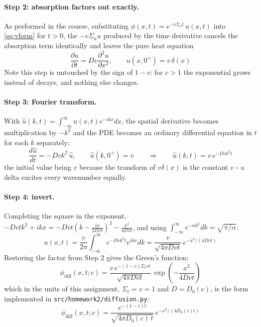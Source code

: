 \documentclass[11pt]{article}
\begin{document}
\paragraph{Step 2: absorption factors out exactly.} As performed in the course, substituting
$\phi(x,t) = e^{-v\Sigma_a t}\,u(x,t)$ into \eqref{eq:vform} for $t>0$, the $-v\Sigma_a u$
produced by the time derivative cancels the absorption term identically and leaves the pure
heat equation
\begin{equation}
    \frac{\partial u}{\partial t} = Dv\frac{\partial^2 u}{\partial x^2},
    \qquad u(x,0^+) = v\,\delta(x)
\end{equation}
Note this step is untouched by the sign of $1-c$: for $c>1$ the exponential grows instead of
decays, and nothing else changes.

\paragraph{Step 3: Fourier transform.} With
$\hat u(k,t) = \int_{-\infty}^{\infty} u(x,t)e^{-ikx}dx$, the spatial derivative becomes
multiplication by $-k^2$ and the PDE becomes an ordinary differential equation in $t$ for each
$k$ separately:
\begin{equation}
    \frac{d\hat u}{dt} = -Dvk^2\,\hat u, \qquad \hat u(k,0^+) = v
    \qquad\Longrightarrow\qquad
    \hat u(k,t) = v\,e^{-Dvk^2t}
\end{equation}
the initial value being $v$ because the transform of $v\delta(x)$ is the constant $v$ - a
delta excites every wavenumber equally.

\paragraph{Step 4: invert.} Completing the square in the exponent,
$-Dvtk^2 + ikx = -Dvt\left(k - \frac{ix}{2Dvt}\right)^2 - \frac{x^2}{4Dvt}$, and using
$\int_{-\infty}^{\infty}e^{-\alpha k^2}dk = \sqrt{\pi/\alpha}$:
\begin{equation}
    u(x,t) = \frac{v}{2\pi}\int_{-\infty}^{\infty} e^{-Dvk^2t}e^{ikx}dk
           = \frac{v}{\sqrt{4\pi Dvt}}\,e^{-x^2/(4Dvt)}
\end{equation}
Restoring the factor from Step 2 gives the Green's function:
\begin{equation}
    \boxed{\;\phi_{\text{diff}}(x,t;c) = \frac{v\,e^{-(1-c)\Sigma_t v t}}{\sqrt{4\pi Dvt}}\,
    \exp\!\left(-\frac{x^2}{4Dvt}\right)\;}\label{eq:green}
\end{equation}
which in the units of this assignment, $\Sigma_t = v = 1$ and $D = D_0(c)$, is the form
implemented in \texttt{src/homework2/diffusion.py}:
\begin{equation}
    \boxed{\;\phi_{\text{diff}}(x,t;c) = \frac{e^{-(1-c)t}}{\sqrt{4\pi D_0(c)\,t}}\,e^{-x^2/(4D_0(c)t)}\;}
\end{equation}
\end{document}

